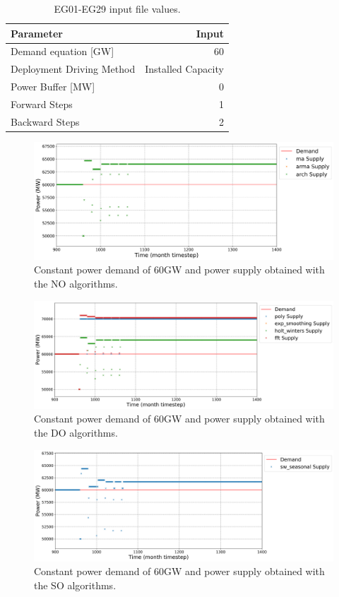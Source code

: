 \documentclass[11pt]{article}
\begin{document}
\begin{table}[H]
	\centering
	\caption{EG01-EG29 input file values.}
	\label{tab:29-inputs}
	\begin{tabularx}{\textwidth}{lR}
		\hline
		Parameter			& Input \\ 	\hline
		Demand equation [GW]		& 60  \\
		Deployment Driving Method 	& Installed Capacity \\
		Power Buffer [MW]    			& 0 \\
		Forward Steps		& 1 \\
		Backward Steps		& 2 \\		\hline
	\end{tabularx}
\end{table}

\begin{figure}[H]
	\centering
	\includegraphics[width=\textwidth]{29-figures/29-power0-buffer01.png} 
	\hfill
	\caption{Constant power demand of 60GW and power supply obtained with the NO algorithms.}
	\label{fig:29-NO}
\end{figure}

\begin{figure}[H]
	\centering
	\includegraphics[width=\textwidth]{29-figures/29-power0-buffer02.png} 
	\hfill
	\caption{Constant power demand of 60GW and power supply obtained with the DO algorithms.}
	\label{fig:29-DO}
\end{figure}

\begin{figure}[H]
	\centering
	\includegraphics[width=\textwidth]{29-figures/29-power0-buffer03.png} 
	\hfill
	\caption{Constant power demand of 60GW and power supply obtained with the SO algorithms.}
	\label{fig:29-SO}
\end{figure}
\end{document}
